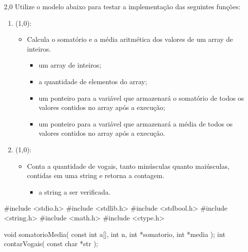 \documentclass[
    12pt,     
    openright,
    twoside,  
    a4paper,  
    english,  
    brazil,   
]{memoir}
\begin{document}
\begin{questaoProgramacao}{2,0}{}{}
    Utilize o modelo abaixo para testar a implementação das seguintes funções:
    
    \begin{enumerate}
    
        \item {} (1,0):
        \begin{itemize}
            \item Calcula o somatório e a média aritmética dos valores de um array de inteiros.
            \begin{itemize}
                \item {} um array de inteiros;
                \item {} a quantidade de elementos do array;
                \item {} um ponteiro para a variável que armazenará o somatório de todos os valores contidos no array após a execução;
                \item {} um ponteiro para a variável que armazenará a média de todos os valores contidos no array após a execução.
            \end{itemize}
        \end{itemize}
        
        \item {} (1,0):
        \begin{itemize}
            \item Conta a quantidade de vogais, tanto minúsculas quanto maiúsculas, contidas em uma string e retorna a contagem.
            \begin{itemize}
                \item {} a string a ser verificada.
            \end{itemize}
        \end{itemize}
        
    \end{enumerate}
    
\begin{blocoC}[\normalsize]
#include <stdio.h>
#include <stdlib.h>
#include <stdbool.h>
#include <string.h>
#include <math.h>
#include <ctype.h>

void somatorioMedia( const int a[], int n, int *somatorio, int *media );
int contarVogais( const char *str );


\end{blocoC}
\end{questaoProgramacao}
\end{document}
